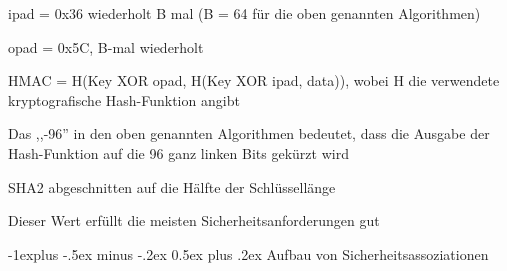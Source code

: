 \documentclass[a4paper]{article}
\makeatletter
\renewcommand{\subsection}{\@startsection{subsection}{2}{0mm}%
 {-1explus -.5ex minus -.2ex}%
 {0.5ex plus .2ex}%
 {\normalfont\normalsize\bfseries}}
\makeatother
\begin{document}
\begin{multicols}{3}
\begin{itemize*}
\begin{itemize*}
                  \begin{itemize*} \item ipad = 0x36 wiederholt B mal (B = 64 für die oben genannten Algorithmen) \item opad = 0x5C, B-mal wiederholt \item HMAC = H(Key XOR opad, H(Key XOR ipad, data)), wobei H die verwendete kryptografische Hash-Funktion angibt \end{itemize*}
                  \item Das ,,-96'' in den oben genannten Algorithmen bedeutet, dass die Ausgabe der Hash-Funktion auf die 96 ganz linken Bits gekürzt wird
                  \item SHA2 abgeschnitten auf die Hälfte der Schlüssellänge
                  \item Dieser Wert erfüllt die meisten Sicherheitsanforderungen gut
            \end{itemize*}
      \end{itemize*}


      \subsection{Aufbau von
            Sicherheitsassoziationen}


\end{multicols}
\end{document}
